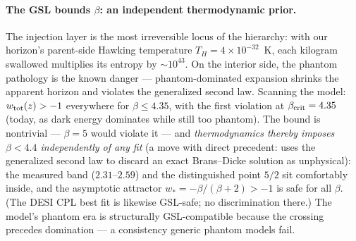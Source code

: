 \documentclass[11pt]{article}
\begin{document}
\paragraph{The GSL bounds $\beta$: an independent thermodynamic prior.} The injection layer is the most irreversible locus of the hierarchy: with our horizon's parent-side Hawking temperature $T_H = 4\times10^{-32}$~K, each kilogram swallowed multiplies its entropy by $\sim 10^{43}$. On the interior side, the phantom pathology is the known danger --- phantom-dominated expansion shrinks the apparent horizon and violates the generalized second law. Scanning the model: $w_{\rm tot}(z) > -1$ everywhere for $\beta \leq 4.35$, with the first violation at $\beta_{\rm crit} = 4.35$ (today, as dark energy dominates while still too phantom). The bound is nontrivial --- $\beta = 5$ would violate it --- and \emph{thermodynamics thereby imposes $\beta < 4.4$ independently of any fit} (a move with direct precedent: \cite{Faraoni2011} uses the generalized second law to discard an exact Brans--Dicke solution as unphysical): the measured band ($2.31$--$2.59$) and the distinguished point $5/2$ sit comfortably inside, and the asymptotic attractor $w_* = -\beta/(\beta+2) > -1$ is safe for all $\beta$. (The DESI CPL best fit is likewise GSL-safe; no discrimination there.) The model's phantom era is structurally GSL-compatible because the crossing precedes domination --- a consistency generic phantom models fail.
\end{document}
